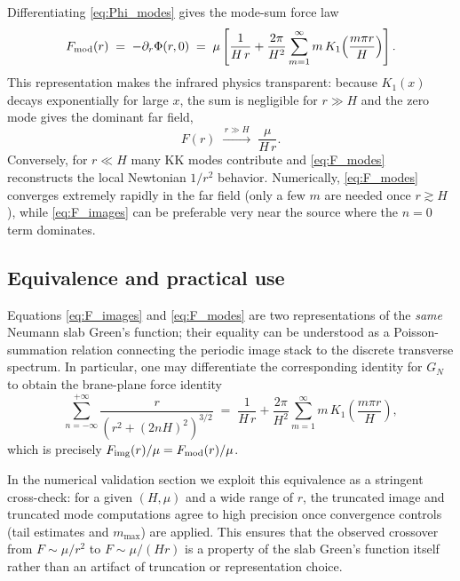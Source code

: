 \documentclass[11pt]{article}
\begin{document}
Differentiating \eqref{eq:Phi_modes} gives the mode-sum force law
\begin{equation}
  F_{\rm mod}(r)
  \;=\; -\partial_r\Phi(r,0)
  \;=\; \mu\left[
    \frac{1}{H\,r}
    + \frac{2\pi}{H^2}\sum_{m=1}^{\infty}
      m\,K_1\!\left(\frac{m\pi r}{H}\right)
  \right].
  \label{eq:F_modes}
\end{equation}
This representation makes the infrared physics transparent:
because $K_1(x)$ decays exponentially for large $x$, the sum is negligible for $r\gg H$ and the zero
mode gives the dominant far field,
\begin{equation}
  F(r)\;\xrightarrow{\,r\gg H\,}\; \frac{\mu}{H\,r}.
\end{equation}
Conversely, for $r\ll H$ many KK modes contribute and \eqref{eq:F_modes} reconstructs the local
Newtonian $1/r^2$ behavior.  Numerically, \eqref{eq:F_modes} converges extremely rapidly in the
far field (only a few $m$ are needed once $r\gtrsim H$), while \eqref{eq:F_images} can be preferable
very near the source where the $n=0$ term dominates.

\subsection{Equivalence and practical use}
\label{sec:equivalence}

Equations \eqref{eq:F_images} and \eqref{eq:F_modes} are two representations of the \emph{same}
Neumann slab Green's function; their equality can be understood as a Poisson-summation relation
connecting the periodic image stack to the discrete transverse spectrum.  In particular, one may
differentiate the corresponding identity for $G_N$ to obtain the brane-plane force identity
\begin{equation}
  \sum_{n=-\infty}^{+\infty}
  \frac{r}{\left(r^2+(2nH)^2\right)^{3/2}}
  \;=\;
  \frac{1}{H\,r}
  + \frac{2\pi}{H^2}\sum_{m=1}^{\infty}
  m\,K_1\!\left(\frac{m\pi r}{H}\right),
  \label{eq:images_modes_identity}
\end{equation}
which is precisely $F_{\rm img}(r)/\mu = F_{\rm mod}(r)/\mu$.

In the numerical validation section we exploit this equivalence as a stringent cross-check:
for a given $(H,\mu)$ and a wide range of $r$, the truncated image and truncated mode computations
agree to high precision once convergence controls (tail estimates and $m_{\max}$) are applied.
This ensures that the observed crossover from $F\sim \mu/r^2$ to $F\sim \mu/(Hr)$ is a property of
the slab Green's function itself rather than an artifact of truncation or representation choice.
\end{document}
